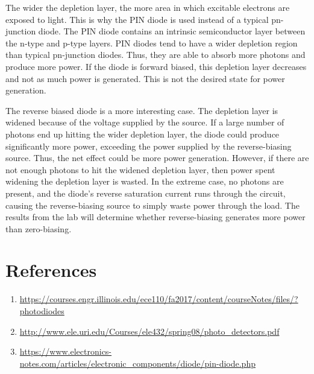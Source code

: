 \documentclass{article}
\begin{document}
{The wider the depletion layer, the more area in which excitable electrons are exposed to light. This is why the PIN diode is used instead of a typical pn-junction diode. The PIN diode contains an intrinsic semiconductor layer between the n-type and p-type layers. PIN diodes tend to have a wider depletion region than typical pn-junction diodes. Thus, they are able to absorb more photons and produce more power. If the diode is forward biased, this depletion layer decreases and not as much power is generated. This is not the desired state for power generation.

The reverse biased diode is a more interesting case. The depletion layer is widened because of the voltage supplied by the source. If a large number of photons end up hitting the wider depletion layer, the diode could produce significantly more power, exceeding the power supplied by the reverse-biasing source. Thus, the net effect could be more power generation. However, if there are not enough photons to hit the widened depletion layer, then power spent widening the depletion layer is wasted. In the extreme case, no photons are present, and the diode's reverse saturation current runs through the circuit, causing the reverse-biasing source to simply waste power through the load. The results from the lab will determine whether reverse-biasing generates more power than zero-biasing.
}

\section{References}
\scriptsize{
\begin{enumerate}
	\item \url{https://courses.engr.illinois.edu/ece110/fa2017/content/courseNotes/files/?photodiodes}
	\item \url{http://www.ele.uri.edu/Courses/ele432/spring08/photo_detectors.pdf}
	\item \url{https://www.electronics-notes.com/articles/electronic_components/diode/pin-diode.php}
\end{enumerate}
}
\end{document}

